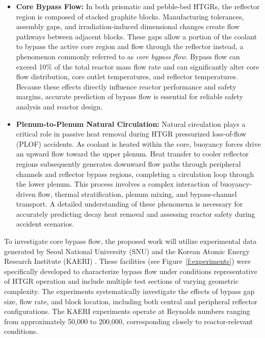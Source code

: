 \begin{itemize}

\item \textbf{Core Bypass Flow:} In both prismatic and pebble-bed HTGRs, the reflector region is composed of stacked graphite blocks. Manufacturing tolerances, assembly gaps, and irradiation-induced dimensional changes create flow pathways between adjacent blocks. These gaps allow a portion of the coolant to bypass the active core region and flow through the reflector instead, a phenomenon commonly referred to as \emph{core bypass flow}. Bypass flow can exceed 10\% of the total reactor mass flow rate and can significantly alter core flow distribution, core outlet temperatures, and reflector temperatures. Because these effects directly influence reactor performance and safety margins, accurate prediction of bypass flow is essential for reliable safety analysis and reactor design.

\item \textbf{Plenum-to-Plenum Natural Circulation:} Natural circulation plays a critical role in passive heat removal during HTGR pressurized loss-of-flow (PLOF) accidents. As coolant is heated within the core, buoyancy forces drive an upward flow toward the upper plenum. Heat transfer to cooler reflector regions subsequently generates downward flow paths through peripheral channels and reflector bypass regions, completing a circulation loop through the lower plenum. This process involves a complex interaction of buoyancy-driven flow, thermal stratification, plenum mixing, and bypass-channel transport. A detailed understanding of these phenomena is necessary for accurately predicting decay heat removal and assessing reactor safety during accident scenarios.

\end{itemize}

To investigate core bypass flow, the proposed work will utilize experimental data generated by Seoul National University (SNU) and the Korean Atomic Energy Research Institute (KAERI) \cite{Park2008KAERI}. These facilities (see Figure~\ref{f:experiments}) were specifically developed to characterize bypass flow under conditions representative of HTGR operation and include multiple test sections of varying geometric complexity. The experiments systematically investigate the effects of bypass gap size, flow rate, and block location, including both central and peripheral reflector configurations. The KAERI experiments operate at Reynolds numbers ranging from approximately 50,000 to 200,000, corresponding closely to reactor-relevant conditions.

